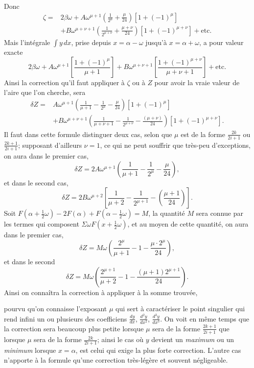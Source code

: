 \documentclass{article}
\begin{document}
Donc
\[ \begin{aligned} \zeta={}&2\beta\omega+A\omega^{\mu+1}\left(\frac{1}{2^{\mu}}+\frac{\mu}{24}\right)[1+(-1)^{\mu}]\\ &+B\omega^{\mu+\nu+1}\left(\frac{1}{2^{\mu+\nu}}+\frac{\mu+\nu}{24}\right)[1+(-1)^{\mu+\nu}]+\text{etc.} \end{aligned} \]
Mais l'intégrale $\displaystyle\int y\,dx$, prise depuis $x=\alpha-\omega$ jusqu'à $x=\alpha+\omega$, a pour valeur exacte
\[ 2\beta\omega+A\omega^{\mu+1}\left[\frac{1+(-1)^{\mu}}{\mu+1}\right]+B\omega^{\mu+\nu+1}\left[\frac{1+(-1)^{\mu+\nu}}{\mu+\nu+1}\right]+\text{etc.} \]
Ainsi la correction qu'il faut appliquer à $\zeta$ ou à $Z$ pour avoir la vraie valeur de l'aire que l'on cherche, sera
\[ \begin{aligned} \delta Z={}&A\omega^{\mu+1}\left(\frac{1}{\mu+1}-\frac{1}{2^{\mu}}-\frac{\mu}{24}\right)[1+(-1)^{\mu}]\\ &+B\omega^{\mu+\nu+1}\left(\frac{1}{\mu+\nu+1}-\frac{1}{2^{\mu+\nu}}-\frac{(\mu+\nu)}{24}\right)[1+(-1)^{\mu+\nu}]. \end{aligned} \]
Il faut dans cette formule distinguer deux cas, selon que $\mu$ est de la forme $\frac{2k}{2i+1}$ ou $\frac{2k+1}{2i+1}$; supposant d'ailleurs $\nu=1$, ce qui ne peut souffrir que très-peu d'exceptions, on aura dans le premier cas,
\[ \delta Z=2A\omega^{\mu+1}\left(\frac{1}{\mu+1}-\frac{1}{2^{\mu}}-\frac{\mu}{24}\right), \]
et dans le second cas,
\[ \delta Z=2B\omega^{\mu+2}\left[\frac{1}{\mu+2}-\frac{1}{2^{\mu+1}}-\left(\frac{\mu+1}{24}\right)\right]. \]
Soit $F(\alpha+\frac{1}{2}\omega)-2F(\alpha)+F(\alpha-\frac{1}{2}\omega)=M$, la quantité $M$ sera connue par les termes qui composent $\Sigma\omega F(x+\frac{1}{2}\omega)$, et au moyen de cette quantité, on aura dans le premier cas,
\[ \delta Z=M\omega\left(\frac{2^{\mu}}{\mu+1}-1-\frac{\mu\cdot2^{\mu}}{24}\right), \]
et dans le second
\[ \delta Z=M\omega\left(\frac{2^{\mu+1}}{\mu+2}-1-\frac{(\mu+1)2^{\mu+1}}{24}\right). \]
Ainsi on connaîtra la correction à appliquer à la somme trouvée,

pourvu qu'on connaisse l'exposant $\mu$ qui sert à caractériser le point singulier qui rend infini un ou plusieurs des coefficiens $\frac{dy}{dx}$, $\frac{d^{2}y}{dx^{2}}$, $\frac{d^{3}y}{dx^{3}}$. On voit en même temps que la correction sera beaucoup plus petite lorsque $\mu$ sera de la forme $\frac{2k+1}{2i+1}$ que lorsque $\mu$ sera de la forme $\frac{2k}{2i+1}$; ainsi le cas où $y$ devient un \emph{maximum} ou un \emph{minimum} lorsque $x=\alpha$, est celui qui exige la plus forte correction. L'autre cas n'apporte à la formule qu'une correction très-légère et souvent négligeable.
\end{document}
